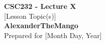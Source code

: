 \begin{titlepage}
    \null %
    \vfill
    \begin{center}
        {\fontsize{40}{48}\selectfont \bfseries CSC232 - Lecture X}
        \vspace{20pt} \\
        {\LARGE [Lesson Topic(s)]} \\
        \vspace{20pt}
        \textbf{AlexanderTheMango}
        \vspace{8pt}
        \\ Prepared for [Month Day, Year]
    \end{center}
    \vfill
\end{titlepage}
